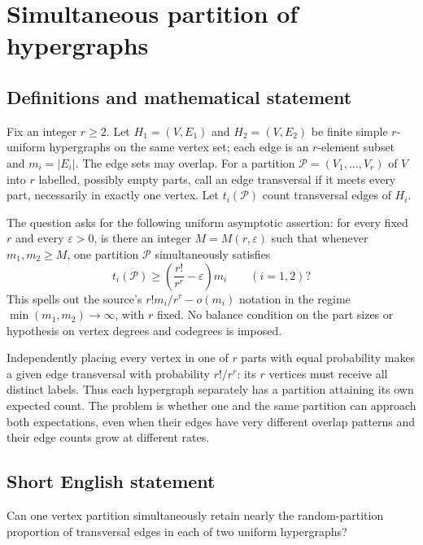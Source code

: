 \documentclass[11pt,a4paper]{article}
\begin{document}
\section*{Simultaneous partition of hypergraphs}\label{statement}

\subsection{Definitions and mathematical statement}
Fix an integer $r\ge2$. Let $H_1=(V,E_1)$ and $H_2=(V,E_2)$ be finite
simple $r$-uniform hypergraphs on the same vertex set; each edge is an
$r$-element subset and $m_i=|E_i|$. The edge sets may overlap. For a
partition $\mathcal P=(V_1,\ldots,V_r)$ of $V$ into $r$ labelled,
possibly empty parts, call an edge transversal if it meets every
part, necessarily in exactly one vertex. Let $t_i(\mathcal P)$ count
transversal edges of $H_i$.

The question asks for the following uniform asymptotic assertion:
for every fixed $r$ and every $\varepsilon>0$, is there an integer
$M=M(r,\varepsilon)$ such that whenever $m_1,m_2\ge M$, one partition
$\mathcal P$ simultaneously satisfies
\[
             t_i(\mathcal P)\ge
             \left(\frac{r!}{r^r}-\varepsilon\right)m_i
                         \qquad(i=1,2)?
\]
This spells out the source's $r!m_i/r^r-o(m_i)$ notation in the regime
$\min(m_1,m_2)\to\infty$, with $r$ fixed. No balance condition on the
part sizes or hypothesis on vertex degrees and codegrees is imposed.

Independently placing every vertex in one of $r$ parts with equal
probability makes a given edge transversal with probability $r!/r^r$:
its $r$ vertices must receive all distinct labels. Thus each hypergraph
separately has a partition attaining its own expected count. The
problem is whether one and the same partition can approach both
expectations, even when their edges have very different overlap
patterns and their edge counts grow at different rates.
\subsection{Short English statement}
Can one vertex partition simultaneously retain nearly the random-partition proportion of transversal edges in each of two uniform hypergraphs?
\end{document}
